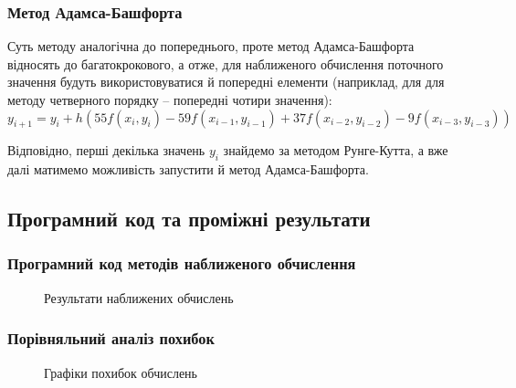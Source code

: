 \documentclass[a4paper,14pt]{extarticle} %
\begin{document}
\subsubsection*{Метод Адамса-Башфорта}

Суть методу аналогічна до попереднього, проте метод Адамса-Башфорта відносять до багатокрокового, а отже, 
для наближеного обчислення поточного значення будуть використовуватися й попередні елементи (наприклад, для 
для методу четверного порядку -- попередні чотири значення):
\[ y_{i+1}=y_i + h(55f(x_i,y_i) - 59f(x_{i-1},y_{i-1}) + 37f(x_{i-2},y_{i-2}) -  9f(x_{i-3},y_{i-3})) \]

Відповідно, перші декілька значень $y_i$ знайдемо за методом Рунге-Кутта, а вже далі матимемо можливість 
запустити й метод Адамса-Башфорта.

\subsection*{Програмний код та проміжні результати}

\subsubsection*{Програмний код методів наближеного обчислення}



\begin{figure}[H]
    \caption{Результати наближених обчислень}
    \label{fig:R&A}
\end{figure}

\subsubsection*{Порівняльний аналіз похибок}



\begin{figure}[H]
    \caption{Графіки похибок обчислень}
    \label{fig:Errors}
\end{figure}
\end{document}
